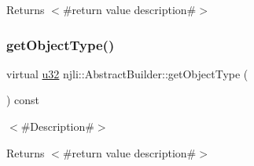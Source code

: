 \begin{DoxyReturn}{Returns}
$<$\#return value description\#$>$ 
\end{DoxyReturn}
\mbox{\label{classnjli_1_1_abstract_builder_a0f2d344fcf697b167f4f2b1122b5fb33}} 
\subsubsection{\texorpdfstring{get\+Object\+Type()}{getObjectType()}}
{\footnotesize\ttfamily virtual \mbox{\hyperlink{_util_8h_a10e94b422ef0c20dcdec20d31a1f5049}{u32}} njli\+::\+Abstract\+Builder\+::get\+Object\+Type (\begin{DoxyParamCaption}{ }\end{DoxyParamCaption}) const\hspace{0.3cm}{\ttfamily [pure virtual]}}

$<$\#\+Description\#$>$

\begin{DoxyReturn}{Returns}
$<$\#return value description\#$>$ 
\end{DoxyReturn}


